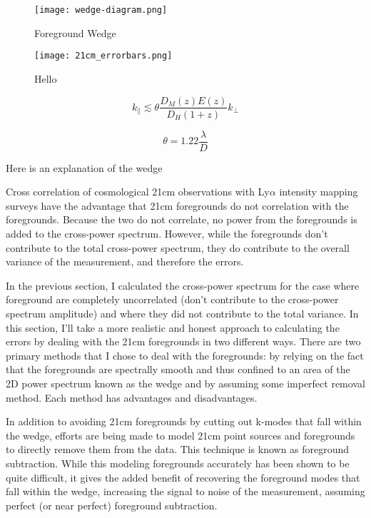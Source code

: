 \begin{figure}[ht]
	\centering
	\texttt{[image: wedge-diagram.png]}
	\caption[Foreground Wedge]{Foreground Wedge}
	\label{fig:wedge}
\end{figure}

\begin{figure}[th]
	\centering
	\texttt{[image: 21cm\_errorbars.png]}
	\caption[Noise Power Spectrum]{Hello}
	\label{fig:21cm_errors}
\end{figure}

\begin{equation}
    k_{\parallel} \lesssim  \theta \frac{D_{M}\left( z \right) E \left( z \right)}{D_H \left(1 + z\right)} k_{\perp}
\end{equation}

\begin{equation}
    \theta = 1.22 \frac{\lambda}{D}
\end{equation}

Here is an explanation of the wedge

Cross correlation of cosmological 21cm observations with Ly$\alpha$ intensity
mapping surveys have the advantage that 21cm foregrounds do not correlation with
the foregrounds. Because the two do not correlate, no power from the foregrounds
is added to the cross-power spectrum. However, while the foregrounds don't contribute
to the total cross-power spectrum, they do contribute to the overall variance
of the measurement, and therefore the errors.

In the previous section, I calculated the cross-power spectrum for the case where
foreground are completely uncorrelated (don't contribute to the cross-power spectrum
amplitude) and where they did not contribute to the total variance. In this section,
I'll take a more realistic and honest approach to calculating the errors by dealing
with the 21cm foregrounds in two different ways. There are two primary methods
that I chose to deal with the foregrounds: by relying on the fact that the foregrounds
are spectrally smooth and thus confined to an area of the 2D power spectrum known
as the wedge and by assuming some imperfect removal method. Each method has advantages
and disadvantages.

In addition to avoiding 21cm foregrounds by cutting out k-modes that fall within
the wedge, efforts are being made to model 21cm point sources and foregrounds to
directly remove them from the data. This technique is known as foreground subtraction.
While this modeling foregrounds accurately has been shown to be quite difficult,
it gives the added benefit of recovering the foreground modes that fall within
the wedge, increasing the signal to noise of the measurement, assuming perfect (or
near perfect) foreground subtraction.

